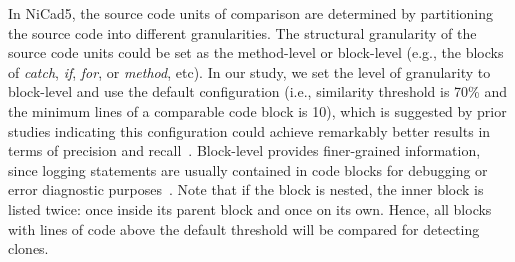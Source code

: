 In NiCad5, the source code units of comparison are determined by partitioning the source code into different granularities. %
The structural granularity of the source code units could be set as the method-level or block-level (e.g., the blocks of {\em catch}, {\em if}, {\em for}, or {\em method}, etc). In our study, we set the level of granularity to block-level and use the default configuration (i.e., similarity threshold is 70\% and the minimum lines of a comparable code block is 10),
which is suggested by prior studies indicating this configuration could achieve remarkably better results in terms of precision and recall~\cite{EvaluatingModernCloneDetectionTools, ROY2009470, nicad}. Block-level provides finer-grained information, since logging statements are usually contained in code blocks for debugging or error diagnostic purposes~\cite{Fu:2014:DLE:2591062.2591175}. Note that if the block is nested, the inner block is listed twice: once inside its parent block and once on its own. Hence, all blocks with lines of code above the default threshold will be compared for detecting clones. %
